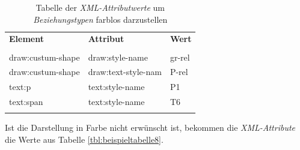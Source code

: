 \begin{table}[H]
	\centering
	\begin{tabular}{lll}
		\textbf{Element} & \textbf{Attribut}  & \textbf{Wert} \\
		\\
		draw:custum-shape & draw:style-name           & gr-rel             \\
		draw:custum-shape & draw:text-style-nam      & P-rel             \\
		text:p & text:style-name       & P1             \\
		text:span & text:style-name       & T6            \\
		\\
	\end{tabular}
	
	\caption{Tabelle der \textit{XML-Attributwerte} um \textit{Beziehungstypen} farblos darzustellen}
	\label{tbl:beispieltabelle7}
	
\end{table}
\hon{}
\noindent
Ist die Darstellung in Farbe nicht erwünscht ist, bekommen die \textit{XML-Attribute} die Werte aus Tabelle \ref{tbl:beispieltabelle8}.

